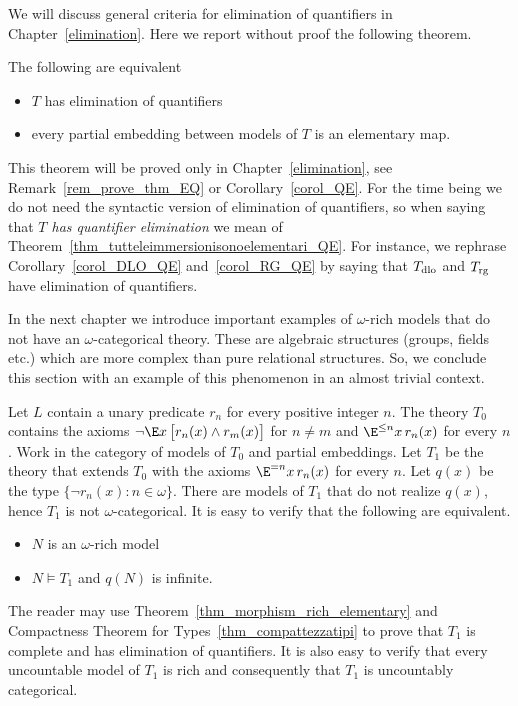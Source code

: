 We will discuss general criteria for elimination of quantifiers in Chapter~\ref{elimination}.
Here we report without proof the following theorem.

\begin{theorem}\label{thm_tutteleimmersionisonoelementari_QE}
The following are equivalent
\begin{itemize}
\item[1.] $T$ has elimination of quantifiers
\item[2.] every partial embedding between models of $T$ is an elementary map.
\end{itemize}
\end{theorem}

\noindent\llap{\textcolor{red}{\Large\warning}\kern1.5ex}This theorem will be proved only in Chapter~\ref{elimination}, see Remark~\ref{rem_prove_thm_EQ} or Corollary~\ref{corol_QE}.
%
For the time being we do not need the syntactic version of elimination of quantifiers, so when saying that \textit{$T$ has quantifier elimination\/} we mean  of Theorem~\ref{thm_tutteleimmersionisonoelementari_QE}.
For instance, we rephrase Corollary~\ref{corol_DLO_QE} and~\ref{corol_RG_QE} by saying that $T_{\rm dlo}$ and $T_{\rm rg}$ have elimination of quantifiers.

In the next chapter we introduce important examples of $\omega$-rich models that do not have an $\omega$-categorical theory.
These are algebraic structures (groups, fields etc.) which are more complex than pure relational structures.
So, we conclude this section with an example of this phenomenon in an almost trivial context.

\begin{example}\label{ex_infiniti_colori}
Let $L$ contain a unary predicate $r_n$ for every positive integer $n$.
The theory $T_0$ contains the axioms $\neg\E x\, \big[r_n(x)\wedge r_m(x)\big]$ for $n\neq m$ and $\E^{\le n}x\,r_n(x)$ for every $n$.
Work in the category of models of $T_0$ and partial embeddings.
Let $T_1$ be the theory that extends $T_0$ with the axioms $\E^{= n} x\, r_n(x)$ for every  $n$.
Let $q(x)$ be the type $\big\{\neg r_n(x):n\in\omega\big\}$.
There are models of $T_1$ that do not realize $q(x)$, hence $T_1$ is not $\omega$-categorical.
It is easy to verify that the following are equivalent.
\begin{itemize}
 \item[1.] $N$ is an $\omega$-rich model
 \item[2.] $N\models T_1$ and  $q(N)$ is infinite.
\end{itemize}
The reader may use Theorem~\ref{thm_morphism_rich_elementary} and Compactness Theorem for Types~\ref{thm_compattezzatipi} to prove that $T_1$ is complete and has elimination of quantifiers.
It is also easy to verify that every uncountable model of $T_1$ is rich and consequently that $T_1$ is uncountably categorical.
\end{example}

